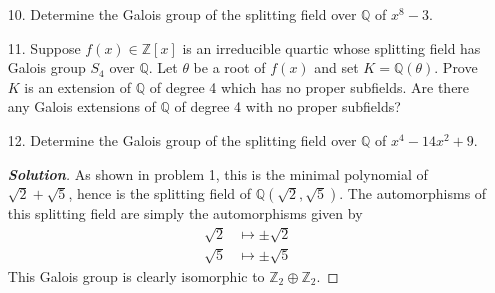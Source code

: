 \documentclass[12pt,leqno]{article}
\theoremstyle{definition}
\newcommand{\Z}{\mathbb{Z}}
\newcommand{\Q}{\mathbb{Q}}
\newcommand{\+}{\oplus}
\newenvironment{Solution}{\begin{proof}[\textnormal{\textbf{Solution}}]}{\end{proof}}
\begin{document}
\begin{enumerate}
   \item [10.] Determine the Galois group of the splitting field over $\Q$ of $x^8-3$.
   \item [11.] Suppose $f(x)\in\Z[x]$ is an irreducible quartic whose splitting field has Galois group $S_4$ over $\Q$. Let $\theta$ be a root of $f(x)$ and set $K=\Q(\theta)$. Prove $K$ is an extension of $\Q$ of degree 4 which has no proper subfields. Are there any Galois extensions of $\Q$ of degree 4 with no proper subfields?
   \item [12.] Determine the Galois group of the splitting field over $\Q$ of $x^4-14x^2+9$. 
    \begin{Solution}
     As shown in problem 1, this is the minimal polynomial of $\sqrt{2}+\sqrt{5}$, hence is the splitting field of $\Q(\sqrt{2},\sqrt{5})$. The automorphisms of this splitting field are simply the automorphisms given by \begin{align*}\sqrt{2}&\mapsto\pm\sqrt{2}\\\sqrt{5}&\mapsto\pm\sqrt{5}\end{align*} This Galois group is clearly isomorphic to $\Z_2\+\Z_2$.
    \end{Solution}
   \end{enumerate}
\end{document}
